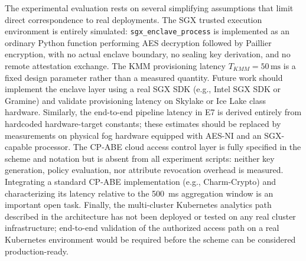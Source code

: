 \documentclass[conference]{IEEEtran}
\begin{document}
    The experimental evaluation rests on several simplifying assumptions that limit direct correspondence to real deployments. The SGX trusted execution environment is entirely simulated: \texttt{sgx\_enclave\_process} is implemented as an ordinary Python function performing AES decryption followed by Paillier encryption, with no actual enclave boundary, no sealing key derivation, and no remote attestation exchange. The KMM provisioning latency $T_{KMM}=50\,\text{ms}$ is a fixed design parameter rather than a measured quantity. Future work should implement the enclave layer using a real SGX SDK (e.g., Intel SGX SDK or Gramine) and validate provisioning latency on Skylake or Ice Lake class hardware. Similarly, the end-to-end pipeline latency in E7 is derived entirely from hardcoded hardware-target constants; these estimates should be replaced by measurements on physical fog hardware equipped with AES-NI and an SGX-capable processor. The CP-ABE cloud access control layer is fully specified in the scheme and notation but is absent from all experiment scripts: neither key generation, policy evaluation, nor attribute revocation overhead is measured. Integrating a standard CP-ABE implementation (e.g., Charm-Crypto) and characterizing its latency relative to the 500~ms aggregation window is an important open task. Finally, the multi-cluster Kubernetes analytics path described in the architecture has not been deployed or tested on any real cluster infrastructure; end-to-end validation of the authorized access path on a real Kubernetes environment would be required before the scheme can be considered production-ready.
\end{document}
